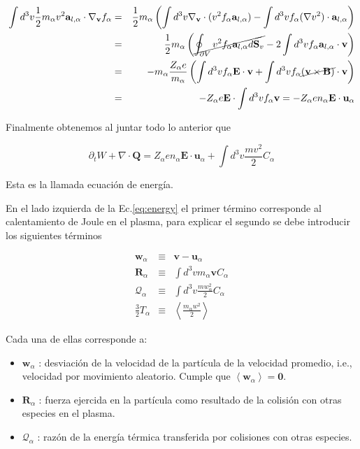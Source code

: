 \begin{eqnarray}
  \int d^3v \frac{1}{2}m_\alpha v^2\textbf{a}_{l,\alpha}\cdot \nabla_\textbf{v}f_\alpha&=& \frac{1}{2}m_\alpha \left(\int d^3v \nabla_\textbf{v}\cdot(v^2f_\alpha\textbf{a}_{l,\alpha}) - \int d^3v f_\alpha (\nabla v^2) \cdot \textbf{a}_{l,\alpha}\right)\nonumber\\
  &=& \frac{1}{2}m_\alpha\left(\cancel{\oint_{\partial V}v^2f_\alpha \textbf{a}_{l,\alpha}d\textbf{S}_v} - 2\int d^3v f_\alpha \textbf{a}_{l,\alpha}\cdot\textbf{v}\right) \nonumber\\
  &=& -m_\alpha\frac{Z_\alpha e}{m_\alpha}\left(\int d^3v f_\alpha \textbf{E}\cdot\textbf{v} + \int d^3v f_\alpha \cancel{(\textbf{v}\times\textbf{B})}\cdot\textbf{v}\right)\nonumber\\
  &=& -Z_\alpha e\textbf{E}\cdot\int d^3v f_\alpha \textbf{v} = -Z_\alpha en_\alpha\textbf{E}\cdot\textbf{u}_\alpha 
\end{eqnarray}

Finalmente obtenemos al juntar todo lo anterior que 

\begin{equation}\label{eq:energy}
  \partial_t W + \nabla\cdot\textbf{Q} = Z_\alpha en_\alpha\textbf{E}\cdot\textbf{u}_\alpha + \int d^3v\frac{mv^2}{2}C_\alpha
\end{equation}

Esta es la llamada ecuaci\'on de energ\'ia.

En el lado izquierda de la Ec.\eqref{eq:energy} el primer t\'ermino corresponde al calentamiento de Joule en el plasma, para explicar el segundo se debe introducir los siguientes t\'erminos

  \begin{eqnarray}
    \textbf{w}_\alpha &\equiv& \textbf{v} - \textbf{u}_\alpha \nonumber\\
    \textbf{R}_\alpha &\equiv& \int d^3v m_\alpha\textbf{v}C_\alpha \nonumber\\
    \mathcal{Q}_\alpha &\equiv& \int d^3v \frac{mw_\alpha^2}{2}C_\alpha \nonumber\\
    \frac{3}{2}T_\alpha &\equiv& \left<\frac{m_\alpha w^2}{2}\right> \label{eq:temp}
  \end{eqnarray}

  Cada una de ellas corresponde a:
  \begin{itemize}
    \item $\textbf{w}_\alpha$ : desviaci\'on de la velocidad de la part\'icula de la velocidad promedio, i.e., velocidad por movimiento aleatorio. Cumple que $\left<\textbf{w}_\alpha\right> = \textbf{0}$.
    \item $\textbf{R}_\alpha$ : fuerza ejercida en la part\'icula como resultado de la colisi\'on con otras especies en el plasma.
    \item $\mathcal{Q}_\alpha$ : raz\'on de la energ\'ia t\'ermica transferida por colisiones con otras especies. 
  \end{itemize}

